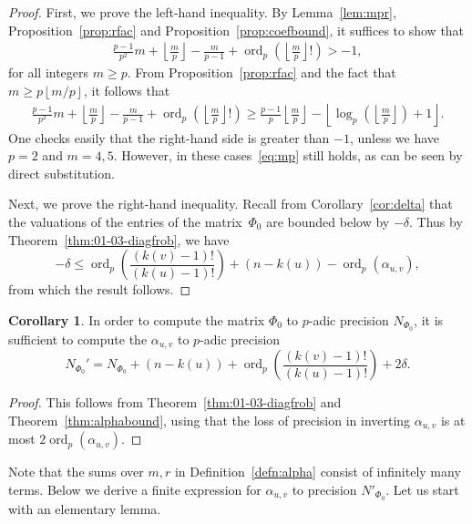 \documentclass[a4paper,11pt]{article}
\numberwithin{equation}{section}
\providecommand{\floor}[1]{\left\lfloor#1\right\rfloor}   %
\DeclareMathOperator{\ord}{ord}          %
\theoremstyle{definition}
\newtheorem{cor}[thm]{Corollary}
\begin{document}
\begin{proof}
First, we prove the left-hand inequality. By Lemma~\ref{lem:mpr}, Proposition~\ref{prop:rfac} 
and Proposition~\ref{prop:coefbound}, it suffices to show that
\begin{align} \label{eq:mp}
\frac{p-1}{p^2}m + \floor{\frac{m}{p}}-\frac{m}{p-1} + \ord_p\left(\floor{\frac{m}{p}}!\right)>-1,
\end{align}
for all integers $m \geq p$. From Proposition~\ref{prop:rfac} and the fact that $m \geq p \floor{m/p}$, it follows that
\begin{align*}
\frac{p-1}{p^2}m + \floor{\frac{m}{p}}-\frac{m}{p-1} + \ord_p\left(\floor{\frac{m}{p}}!\right) \geq \frac{p-1}{p} \floor{\frac{m}{p}} - \floor{\log_p\left(\floor{\frac{m}{p}}\right)+1}.
\end{align*}
One checks easily that the right-hand side is greater than $-1$, unless we have $p=2$ and $m=4,5$. However, in these cases~\eqref{eq:mp} still holds, as can be seen by direct
substitution.

Next, we prove the right-hand inequality. Recall from Corollary~\ref{cor:delta} that the valuations 
of the entries of the matrix~$\Phi_0$ are bounded below by $-\delta$. Thus by Theorem~\ref{thm:01-03-diagfrob}, 
we have
\begin{equation*}
-\delta \leq \ord_p\left(\frac{(k(v) - 1)!}{(k(u) - 1)!} \right)+ (n-k(u)) - \ord_p( \alpha_{u,v}),
\end{equation*}
from which the result follows.
\end{proof}

\begin{cor} \label{cor:NPhi0prime}
In order to compute the matrix $\Phi_0$ to $p$-adic precision $N_{\Phi_0}$, it is sufficient to
compute the $\alpha_{u,v}$ to $p$-adic precision 
\[
N_{\Phi_0}' = N_{\Phi_0} + (n-k(u)) + \ord_p\left(\frac{(k(v) - 1)!}{(k(u) - 1)!} \right) + 2\delta.
\]
\end{cor}

\begin{proof}
This follows from Theorem~\ref{thm:01-03-diagfrob} and Theorem~\ref{thm:alphabound}, using that the
loss of precision in inverting $\alpha_{u,v}$ is at most $2\ord_p(\alpha_{u,v})$.
\end{proof}

Note that the sums over $m,r$ in Definition~\ref{defn:alpha} consist of
infinitely many terms.  Below we derive a finite expression for $\alpha_{u,v}$ 
to precision $N'_{\Phi_0}$. Let us start with an elementary lemma.
\end{document}
